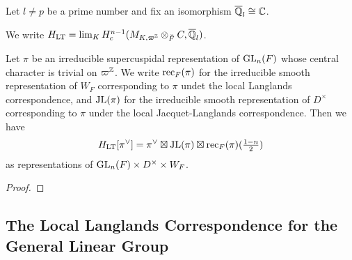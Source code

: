 \documentclass[../main.tex]{subfiles}
\begin{document}
Let $l \neq p$ be a prime number and fix an isomorphism $\overline {\mathbb{Q}}_l \cong \mathbb{C}$.

\begin{defi}
  We write $H_{\mathrm{LT}} = \lim_{K} H^{n-1}_c (M_{K, \varpi^{\mathbb{Z}}} \otimes_{\breve F} C, \overline {\mathbb{Q}}_l)$.
\end{defi}

\begin{thm}
  Let $\pi$ be an irreducible supercuspidal representation of $\operatorname{GL}_n(F)$ whose central
  character is trivial on $\varpi^{\mathbb{Z}}$. We write $\mathrm{rec}_F(\pi)$ for the irreducible 
  smooth representation of $W_F$ corresponding to $\pi$ undet the local Langlands
  correspondence, and $\mathrm{JL}(\pi)$ for the irreducible smooth representation of
  $D^\times$ corresponding to $\pi$ under the local Jacquet-Langlands correspondence.
  Then we have 
  \begin{equation*}
    H_{\mathrm{LT}}[\pi^\vee] = \pi^\vee \boxtimes \mathrm{JL}(\pi) \boxtimes \mathrm{rec}_F(\pi)(\tfrac{1-n}2)
  \end{equation*}
  as representations of $\operatorname{GL}_n(F) \times D^\times \times W_F$. 
\begin{proof}
\end{proof}
\end{thm}


\subsection{The Local Langlands Correspondence for the General Linear Group} %
\label{sub:The Local Langlands Correspondence for the General Linear Group}
\end{document}
